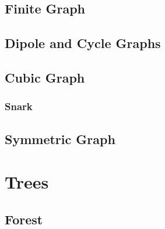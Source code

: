 \subsection{Finite Graph} \label{sec:finite_graph}

\subsection{Dipole and Cycle Graphs} \label{sec:dipole_cycle_graph}

\subsection{Cubic Graph} \label{sec:cubic_graph}

\subsubsection{Snark} \label{sec:snark}



\subsection{Symmetric Graph} \label{sec:symmetric_graph}

\section{Trees} \label{sec:trees}

\subsection{Forest} \label{sec:forest}
